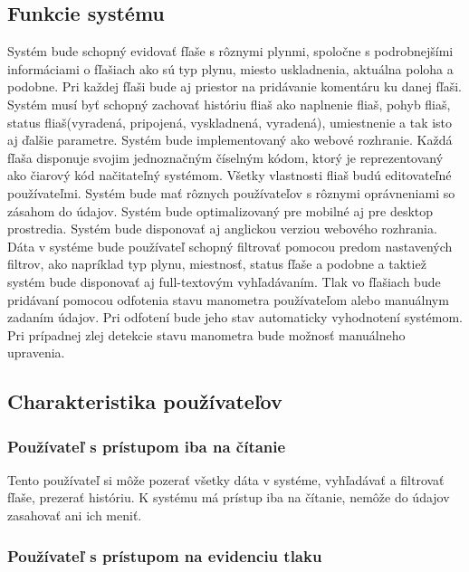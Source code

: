 \documentclass[hreffootnote]{zah}
\begin{document}
\subsection{Funkcie systému}
\label{gen:functions}
Systém bude schopný evidovať fľaše s rôznymi plynmi, spoločne s podrobnejšími informáciami o fľašiach ako sú typ plynu, miesto uskladnenia, aktuálna poloha a podobne. Pri každej fľaši bude aj priestor na pridávanie komentáru ku danej fľaši. Systém musí byť schopný zachovať históriu fliaš ako naplnenie fliaš, pohyb fliaš, status fliaš(vyradená, pripojená, vyskladnená, vyradená), umiestnenie a tak isto aj ďalšie parametre. Systém bude implementovaný ako webové rozhranie. Každá fľaša disponuje svojim jednoznačným číselným kódom, ktorý je reprezentovaný ako čiarový kód načitateľný systémom. Všetky vlastnosti fliaš budú editovateľné používateľmi. Systém bude mať rôznych používateľov s rôznymi oprávneniami so zásahom do údajov. Systém bude optimalizovaný pre mobilné aj pre desktop prostredia. Systém bude disponovať aj anglickou verziou webového rozhrania. Dáta v systéme bude používateľ schopný filtrovať pomocou predom nastavených filtrov, ako napríklad typ plynu, miestnosť, status fľaše a podobne a taktiež systém bude disponovať aj full-textovým vyhľadávaním. Tlak vo fľašiach bude pridávaní pomocou odfotenia stavu manometra používateľom alebo manuálnym zadaním údajov. Pri odfotení bude jeho stav automaticky vyhodnotení systémom. Pri prípadnej zlej detekcie stavu manometra bude možnosť manuálneho upravenia.

\subsection{Charakteristika používateľov}
\label{gen:users}

\subsubsection{Používateľ s prístupom iba na čítanie}
\label{gen:users:ro}

Tento používateľ si môže pozerať všetky dáta v systéme, vyhľadávať a filtrovať fľaše, prezerať históriu. K systému má prístup iba na čítanie, nemôže do údajov zasahovať ani ich meniť.

\subsubsection{Používateľ s prístupom na evidenciu tlaku}
\label{gen:users:meter}
\end{document}
